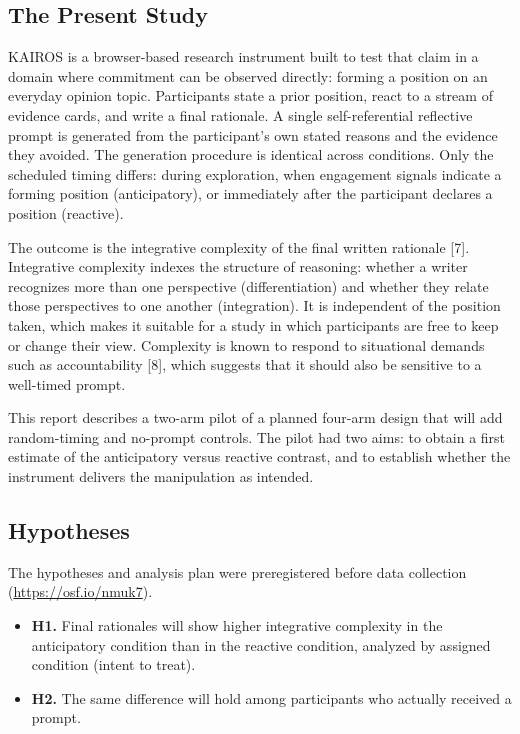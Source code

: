 \documentclass[12pt,letterpaper]{article}
\begin{document}
\subsection{The Present Study}
KAIROS is a browser-based research instrument built to test that claim in a domain where commitment can be observed directly: forming a position on an everyday opinion topic. Participants state a prior position, react to a stream of evidence cards, and write a final rationale. A single self-referential reflective prompt is generated from the participant's own stated reasons and the evidence they avoided. The generation procedure is identical across conditions. Only the scheduled timing differs: during exploration, when engagement signals indicate a forming position (anticipatory), or immediately after the participant declares a position (reactive).

The outcome is the integrative complexity of the final written rationale [7]. Integrative complexity indexes the structure of reasoning: whether a writer recognizes more than one perspective (differentiation) and whether they relate those perspectives to one another (integration). It is independent of the position taken, which makes it suitable for a study in which participants are free to keep or change their view. Complexity is known to respond to situational demands such as accountability [8], which suggests that it should also be sensitive to a well-timed prompt.

This report describes a two-arm pilot of a planned four-arm design that will add random-timing and no-prompt controls. The pilot had two aims: to obtain a first estimate of the anticipatory versus reactive contrast, and to establish whether the instrument delivers the manipulation as intended.

\subsection{Hypotheses}
The hypotheses and analysis plan were preregistered before data collection (\url{https://osf.io/nmuk7}).
\begin{itemize}
\item \textbf{H1.} Final rationales will show higher integrative complexity in the anticipatory condition than in the reactive condition, analyzed by assigned condition (intent to treat).
\item \textbf{H2.} The same difference will hold among participants who actually received a prompt.
\end{itemize}
\end{document}
